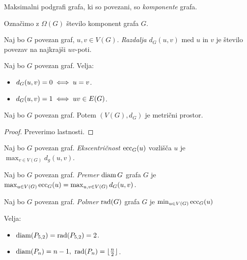 \begin{definicija}
    Maksimalni podgrafi grafa, ki so povezani, so \emph{komponente} grafa. 
\end{definicija}
Označimo z $\Omega(G)$ število komponent grafa $G$.

\begin{definicija}
    Naj bo $G$ povezan graf, $u, v \in V(G)$. \emph{Razdalja $d_G(u,v)$} med $u$ in $v$ je število povezav na najkrajši $uv$-poti.
\end{definicija}

\begin{opomba}
    Naj bo $G$ povezan graf. Velja:
    \begin{itemize}
        \item $d_G(u,v) = 0 \iff u = v$.
        \item $d_G(u,v) = 1 \iff uv \in E(G)$.
    \end{itemize}
\end{opomba}

\begin{trditev}
    Naj bo $G$ povezan graf. Potem $(V(G), d_G)$ je metrični prostor.
\end{trditev}

\begin{proof}
    Preverimo lastnosti.
\end{proof}

\newpage
\begin{definicija}
    Naj bo $G$ povezan graf. \emph{Ekscentričnost $\operatorname{ecc}_G(u)$} vozlišča $u$ je $\max_{v \in V(G)} d_g(u,v)$.
\end{definicija}

\begin{definicija}
    Naj bo $G$ povezan graf. \emph{Premer $\operatorname{diam} G$} grafa $G$ je $\max_{u \in V(G)} \operatorname{ecc}_G(u) = \max_{u,v \in V(G)} d_G(u,v)$.
\end{definicija}

\begin{definicija}
    Naj bo $G$ povezan graf. \emph{Polmer $\operatorname{rad}(G)$} grafa $G$ je $\min_{u \in V(G)} \operatorname{ecc}_G(u)$
\end{definicija}

\begin{primer}
    Velja:
    \begin{itemize}
        \item $\operatorname{diam}(P_{5,2}) = \operatorname{rad}(P_{5,2}) = 2$.
        \item $\operatorname{diam}(P_n) = n-1, \ \operatorname{rad}(P_n) = \lfloor \frac{n}{2} \rfloor$.
    \end{itemize} 
\end{primer}

